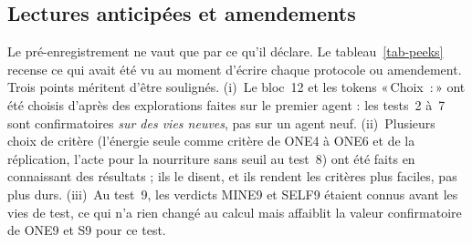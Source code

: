 \documentclass[11pt,a4paper]{article}
\newcommand{\Choix}{«\,Choix~:\,»}
\begin{document}
\subsection{Lectures anticipées et amendements}

Le pré-enregistrement ne vaut que par ce qu'il déclare. Le tableau~\ref{tab-peeks}
recense ce qui avait été vu au moment d'écrire chaque protocole ou amendement. Trois
points méritent d'être soulignés. (i)~Le bloc~12 et les tokens \Choix{} ont été
choisis d'après des explorations faites sur le premier agent : les tests~2 à~7 sont
confirmatoires \emph{sur des vies neuves}, pas sur un agent neuf. (ii)~Plusieurs
choix de critère (l'énergie seule comme critère de ONE4 à ONE6 et de la
réplication, l'acte pour la nourriture sans seuil au test~8) ont été faits en
connaissant des résultats ; ils le disent, et ils rendent les critères plus
faciles, pas plus durs. (iii)~Au test~9, les verdicts MINE9 et SELF9 étaient connus
avant les vies de test, ce qui n'a rien changé au calcul mais affaiblit la valeur
confirmatoire de ONE9 et S9 pour ce test.
\end{document}
